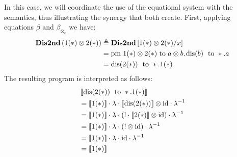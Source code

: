 \begin{example}
   \begin{comment}
     &  \textbf{Dis1stOR2nd} \triangleq - \triangleright  \lambda y: N \otimes N . \, 
\text{case } \text{inl} (*) \,  
  \left\{
    \begin{aligned} 
    &\inl_{\typeB}(w) \Rightarrow  \textbf{Dis1st} \, x; \\
    &\inr_{\typeB}(z) \Rightarrow  \textbf{Dis2nd} \, x   \\ 
  \end{aligned}  
  \right\} : N \otimes N \multimap N  & \\
  & \textbf{Dis1stOR2nd} \, (1 (*) \otimes 2(*)) : N 
    \end{comment}

  In this case, we will coordinate the use of the equational system with the semantics, thus illustrating the synergy that both create. First, applying equations $\beta$ and $\beta_{\otimes_e}$ we have:
   \begin{equation*}
    \begin{split}
    \textbf{Dis2nd} \,(1 (*) \otimes 2(*)) & \triangleq \textbf{Dis2nd} \,[1 (*) \otimes 2(*)/x] \\
    & = \text{pm} \hspace{3 pt}  1 (*) \otimes 2(*) \hspace{3 pt} \text{to} \hspace{3 pt} a \otimes b. \hspace{1 pt} \text{dis}(b) \hspace{3 pt} \text{ to } *.a \\
    & = \text{dis}(2(*)) \hspace{3 pt} \text{ to } *. 1 (*) 
\end{split}
   \end{equation*}
    The resulting program is interpreted as follows:
    \begin{align*}
   &  \left \llbracket  \text{dis}(2(*)) \hspace{3 pt} \text{ to } *. 1 (*) \right \rrbracket \\
    & = \llbracket 1(*) \rrbracket \cdot \lambda \cdot \left \llbracket \text{dis}(2(*)) \right \rrbracket \otimes \mathrm{id} \cdot  \lambda^{-1}  \\
   &  =  \llbracket 1(*) \rrbracket \cdot \lambda \cdot (! \cdot \llbracket 2(*) \rrbracket \otimes \mathrm{id}) \cdot \lambda^{-1} \\
   &  =  \llbracket 1(*) \rrbracket \cdot \lambda \cdot (!  \otimes \mathrm{id}) \cdot \lambda^{-1} \\
   & = \llbracket 1(*) \rrbracket \cdot   \lambda \cdot  \mathrm{id} \cdot  \lambda^{-1} \\
   & =  \llbracket 1(*) \rrbracket 
   \end{align*}

   
\end{example}


